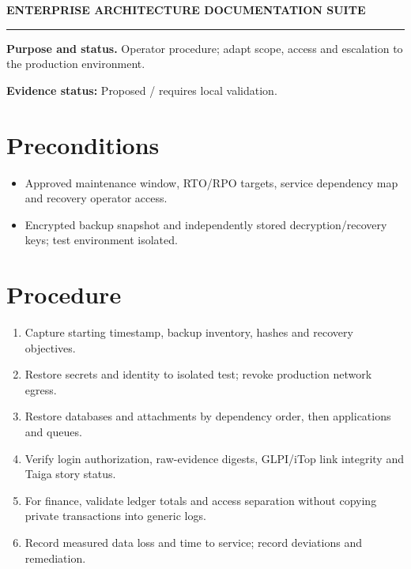 \documentclass[10pt,letterpaper]{article}
\begin{document}
\begin{center}
{\large\bfseries\color{teal} ENTERPRISE ARCHITECTURE DOCUMENTATION SUITE}\par
{}\par
{}\par
\end{center}
\vspace{8pt}\hrule\vspace{12pt}
\textbf{Purpose and status.} Operator procedure; adapt scope, access and escalation to the production environment.\par
\textbf{Evidence status:} Proposed / requires local validation.\par
\section{Preconditions}
\begin{itemize}
\item Approved maintenance window, RTO/RPO targets, service dependency map and recovery operator access.
\item Encrypted backup snapshot and independently stored decryption/recovery keys; test environment isolated.
\end{itemize}
\section{Procedure}
\begin{enumerate}
\item Capture starting timestamp, backup inventory, hashes and recovery objectives.
\item Restore secrets and identity to isolated test; revoke production network egress.
\item Restore databases and attachments by dependency order, then applications and queues.
\item Verify login authorization, raw-evidence digests, GLPI/iTop link integrity and Taiga story status.
\item For finance, validate ledger totals and access separation without copying private transactions into generic logs.
\item Record measured data loss and time to service; record deviations and remediation.
\end{enumerate}
\end{document}
